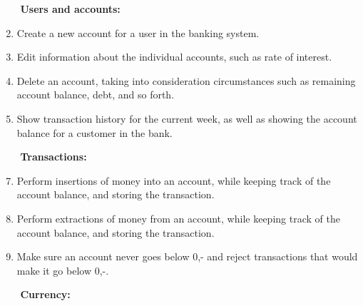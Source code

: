 \begin{mdframed}[backgroundcolor=black!5]
\begin{enumerate}
\item[$ $] \textbf{Users and accounts:}
\item Create a new account for a user in the banking system.

\item Edit information about the individual accounts, such as rate of interest.

\item Delete an account, taking into consideration circumstances such as remaining account balance, debt, and so forth.

\item Show transaction history for the current week, as well as showing the account balance for a customer in the bank.

\item[$ $] \textbf{Transactions:}

\item Perform insertions of money into an account, while keeping track of the account balance, and storing the transaction.

\item Perform extractions of money from an account, while keeping track of the account balance, and storing the transaction.

\item Make sure an account never goes below 0,- and reject transactions that would make it go below 0,-.


\item[$ $] \textbf{Currency:}


\end{enumerate}
\end{mdframed}
